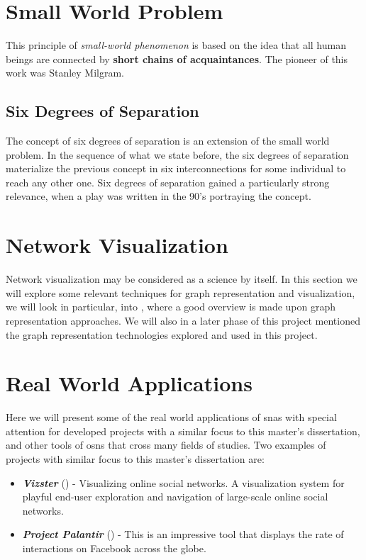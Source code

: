 \section{Small World Problem}
This principle of \textit{small-world phenomenon} is based on the idea that all human beings are connected by \textbf{short chains of acquaintances}. The pioneer of this work was Stanley Milgram.

\subsection*{Six Degrees of Separation}
The concept of six degrees of separation is an extension of the small world problem. In the sequence of what we state before, the six degrees of separation materialize the previous concept in six interconnections for some individual to reach any other one. Six degrees of separation gained a particularly strong relevance, when a play was written in the 90's portraying the concept.

\section{Network Visualization}
Network visualization may be considered as a science by itself. In this section we will explore some relevant techniques for graph representation and visualization, we will look in particular, into \cite{beck2014state}, where a good overview is made upon graph representation approaches. We will also in a later phase of this project mentioned the graph representation technologies explored and used in this project.




\section{Real World Applications}
Here we will present some of the real world applications of \glspl{sna} with special attention for developed projects with a similar focus to this master's dissertation, and other tools of \glspl{osn} that cross many fields of studies. Two examples of projects with similar focus to this master's dissertation are:

\begin{itemize}
    \item \textit{\textbf{Vizster}} (\cite{heer2005vizster}) - Visualizing online social networks. A visualization system for playful end-user exploration and navigation of large-scale online social networks.
    \item \textit{\textbf{Project Palantir}} (\cite{project-palantir}) - This is an impressive tool that displays the rate of interactions on Facebook across the globe.
\end{itemize}
